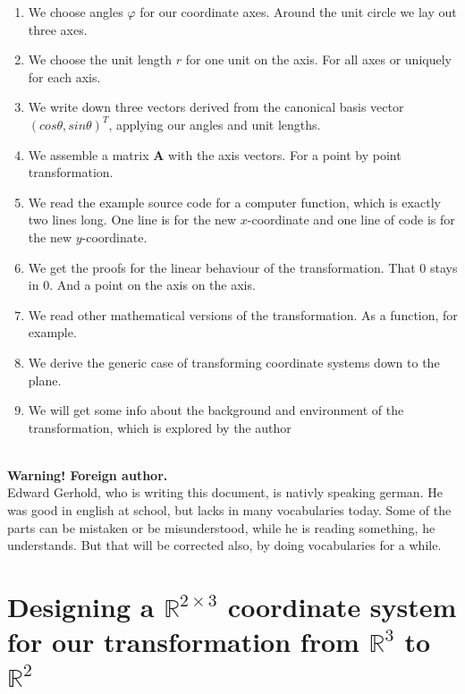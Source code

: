 \documentclass[a4paper]{article}
\begin{document}
\begin{enumerate}
\item We choose angles $\varphi$ for our coordinate axes. Around the unit circle we lay out three axes.
\item We choose the unit length $r$ for one unit on the axis. For all axes or uniquely for each axis.
\item We write down three vectors derived from the canonical basis vector $(cos \theta, sin \theta)^{T}$, applying our angles and unit lengths.
\item We assemble a matrix $\boldsymbol{A}$ with the axis vectors. For a point by point transformation.
\item We read the example source code for a computer function, which is exactly two lines long. One line is for the new $x$-coordinate and one line of code is for the new $y$-coordinate.
\item We get the proofs for the linear behaviour of the transformation. That 0 stays in 0. And a point on the axis on the axis.
\item We read other mathematical versions of the transformation. As a function, for example.
\item We derive the generic case of transforming coordinate systems down to the plane.
\item We will get some info about the background and environment of the transformation, which is explored by the author
\end{enumerate}\\

\textbf{Warning! Foreign author.}\\
Edward Gerhold, who is writing this document, is nativly speaking german. He was good in english at school, but lacks in many vocabularies today. Some of the parts can be mistaken or be misunderstood, while he is reading something, he understands. But that will be corrected also, by doing vocabularies for a while.\\

\section{Designing a $\mathbb{R}^{2\times{3}}$ coordinate system for our transformation from $\mathbb{R}^{3}$ to $\mathbb{R}^{2}$}
\end{document}
